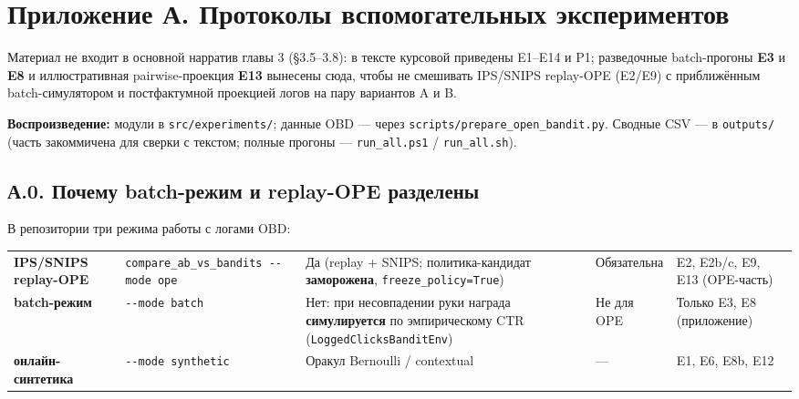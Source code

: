 \section*{Приложение А. Протоколы вспомогательных экспериментов}

Материал не входит в основной нарратив главы 3 (§3.5--3.8): в тексте курсовой приведены E1--E14 и P1; разведочные batch-прогоны \textbf{E3} и \textbf{E8} и иллюстративная pairwise-проекция \textbf{E13} вынесены сюда, чтобы не смешивать IPS/SNIPS replay-OPE (E2/E9) с приближённым batch-симулятором и постфактумной проекцией логов на пару вариантов A и B.

\textbf{Воспроизведение:} модули в \texttt{src/experiments/}; данные OBD --- через \texttt{scripts/prepare\_open\_bandit.py}. Сводные CSV --- в \texttt{outputs/} (часть закоммичена для сверки с текстом; полные прогоны --- \texttt{run\_all.ps1} / \texttt{run\_all.sh}).

\subsection*{А.0. Почему batch-режим и replay-OPE разделены}\label{ux430.0.-ux43fux43eux447ux435ux43cux443-batch-ux440ux435ux436ux438ux43c-ux438-replay-ope-ux440ux430ux437ux434ux435ux43bux435ux43dux44b}

В репозитории три режима работы с логами OBD:

\begingroup\footnotesize\setlength{\tabcolsep}{4pt}
\begin{xltabular}{\linewidth}{@{}
  >{\raggedright\arraybackslash}Y
  >{\raggedright\arraybackslash}Y
  >{\raggedright\arraybackslash}Y
  >{\raggedright\arraybackslash}Y
  >{\raggedright\arraybackslash}Y@{}}
\toprule\noalign{}
\midrule\noalign{}
\endhead
\bottomrule\noalign{}
\endlastfoot
\textbf{IPS/SNIPS replay-OPE} & \texttt{compare\_ab\_vs\_bandits\ -\/-mode\ ope} & Да (replay + SNIPS; политика-кандидат \textbf{заморожена}, \texttt{freeze\_policy=True}) & Обязательна & E2, E2b/c, E9, E13 (OPE-часть) \\
\textbf{batch-режим} & \texttt{-\/-mode\ batch} & Нет: при несовпадении руки награда \textbf{симулируется} по эмпирическому CTR (\texttt{LoggedClicksBanditEnv}) & Не для OPE & Только E3, E8 (приложение) \\
\textbf{онлайн-синтетика} & \texttt{-\/-mode\ synthetic} & Оракул Bernoulli / contextual & --- & E1, E6, E8b, E12 \\
\end{xltabular}
\endgroup

